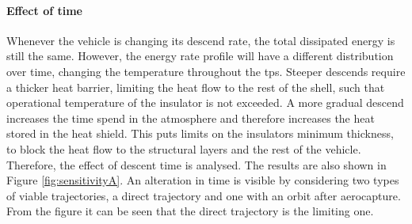 \paragraph{Effect of time}
Whenever the vehicle is changing its descend rate, the total dissipated energy is still the same. However, the energy rate profile will have a different distribution over time, changing the temperature throughout the \gls{tps}. Steeper descends require a thicker heat barrier, limiting the heat flow to the rest of the shell, such that operational temperature of the insulator is not exceeded. A more gradual descend increases the time spend in the atmosphere and therefore increases the heat stored in the heat shield. This puts limits on the insulators minimum thickness, to block the heat flow to the structural layers and the rest of the vehicle. Therefore, the effect of descent time is analysed. The results are also shown in Figure \ref{fig:sensitivityA}. An alteration in time is visible by considering two types of viable trajectories, a direct trajectory and one with an orbit after aerocapture. From the figure it can be seen that the direct trajectory is the limiting one.